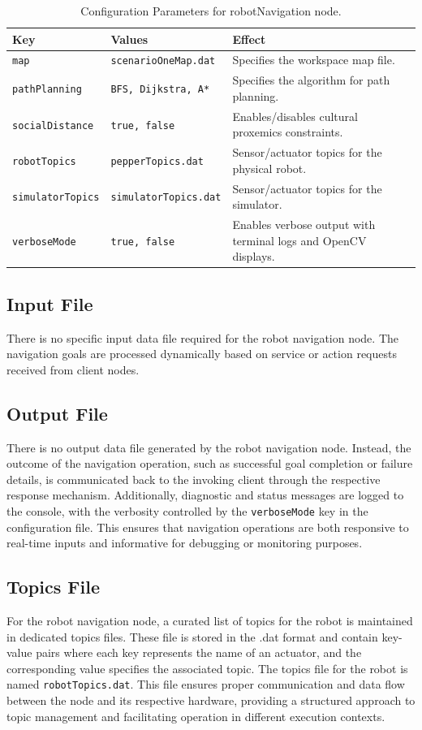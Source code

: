 \documentclass{CSSRforAfrica}
\begin{document}
\begin{table}[H]
\centering
\caption{Configuration Parameters for robotNavigation node.}
\label{tab:robotNavigationConfiguration.ini}
\begin{tabularx}{\textwidth}{|l|l|X|}
\hline
\textbf{Key} & \textbf{Values} & \textbf{Effect} \\ \hline
\verb|map| & \verb|scenarioOneMap.dat| & Specifies the workspace map file. \\ \hline
\verb|pathPlanning| & \verb|BFS, Dijkstra, A*| & Specifies the algorithm for path planning. \\ \hline
\verb|socialDistance| & \verb|true, false| & Enables/disables cultural proxemics constraints. \\ \hline
\verb|robotTopics| & \verb|pepperTopics.dat| & Sensor/actuator topics for the physical robot. \\ \hline
\verb|simulatorTopics| & \verb|simulatorTopics.dat| & Sensor/actuator topics for the simulator. \\ \hline
\verb|verboseMode| & \verb|true, false| & Enables verbose output with terminal logs and OpenCV displays. \\ \hline
\end{tabularx}
\end{table}


\subsection*{Input File}
There is no specific input data file required for the robot navigation node. The navigation goals are processed dynamically based on service or action requests received from client nodes. 
\subsection*{Output File}
There is no output data file generated by the robot navigation node. Instead, the outcome of the navigation operation, such as successful goal completion or failure details, is communicated back to the invoking client through the respective response mechanism. Additionally, diagnostic and status messages are logged to the console, with the verbosity controlled by the \verb|verboseMode| key in the configuration file. This ensures that navigation operations are both responsive to real-time inputs and informative for debugging or monitoring purposes.

\subsection*{Topics File}
For the robot navigation node, a curated list of topics for the robot is maintained in dedicated topics files. These file is stored in the .dat format and contain key-value pairs where each key represents the name of an actuator, and the corresponding value specifies the associated topic. The topics file for the robot is named \verb|robotTopics.dat|. This file ensures proper communication and data flow between the node and its respective hardware, providing a structured approach to topic management and facilitating operation in different execution contexts.
\end{document}
